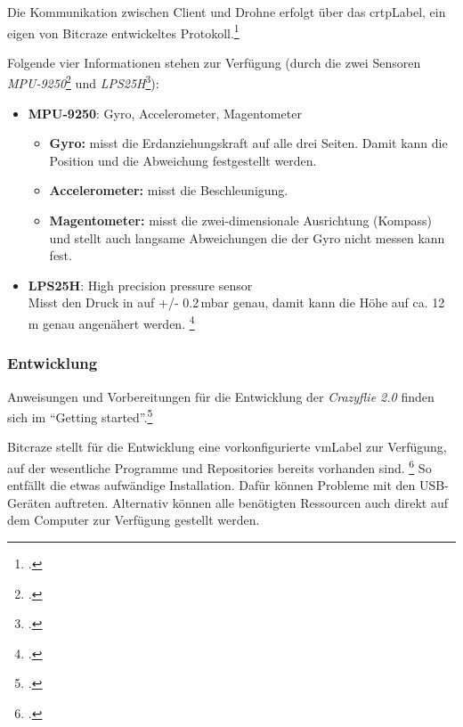 Die Kommunikation zwischen Client und Drohne erfolgt über das \gls{crtpLabel}, ein eigen von Bitcraze entwickeltes Protokoll.\footcite{doc_crazyflie_crtp_index_Bitcraze_Wiki_2015-03-30}

Folgende vier Informationen stehen zur Verfügung (durch die zwei Sensoren \textit{MPU-9250}\footcite{MEMS_Gyro-Accel_Gyroscope_Accelerometer_Processing_-_MPU-9250_Nine-Axis_2015-03-30} und \textit{LPS25H}\footcite{Class-Leading_Miniature_Pressure_Sensor_from_STMicroelectronics_Powers_New_Chapter_in_Mobile_Innovation_2015-03-30}):
\begin{itemize}
	\item \textbf{MPU-9250}: Gyro, Accelerometer, Magentometer\\
	\begin{itemize}
		\item \textbf{Gyro:} misst die Erdanziehungskraft auf alle drei Seiten. Damit kann die Position und die Abweichung festgestellt werden.
		\item \textbf{Accelerometer:} misst die Beschleunigung.
		\item \textbf{Magentometer:} misst die zwei-dimensionale Ausrichtung (Kompass) und stellt auch langsame Abweichungen die der Gyro nicht messen kann fest.
	\end{itemize}
	\item \textbf{LPS25H}: High precision pressure sensor\\
	Misst den Druck in auf +/- 0.2\,mbar genau, damit kann die Höhe auf ca. 12\,m genau angenähert werden.
	\footcite{Barometrische_Hoehenformel__Wikipedia_2015-03-30}
\end{itemize}

\subsubsection{Entwicklung}
Anweisungen und Vorbereitungen für die Entwicklung der \textit{Crazyflie 2.0} finden sich im "`Getting started"'.\footcite{doc_crazyflie_dev:starting_Bitcraze_Wiki_2015-03-29}

Bitcraze stellt für die Entwicklung eine vorkonfigurierte \gls{vmLabel} zur Verfügung, auf der wesentliche Programme und Repositories bereits vorhanden sind.
\footcite{projects_virtualmachine_index_Bitcraze_Wiki_2015-03-30}
So entfällt die etwas aufwändige Installation. Dafür können Probleme mit den USB-Geräten auftreten. Alternativ können alle benötigten Ressourcen auch direkt auf dem Computer zur Verfügung gestellt werden.


